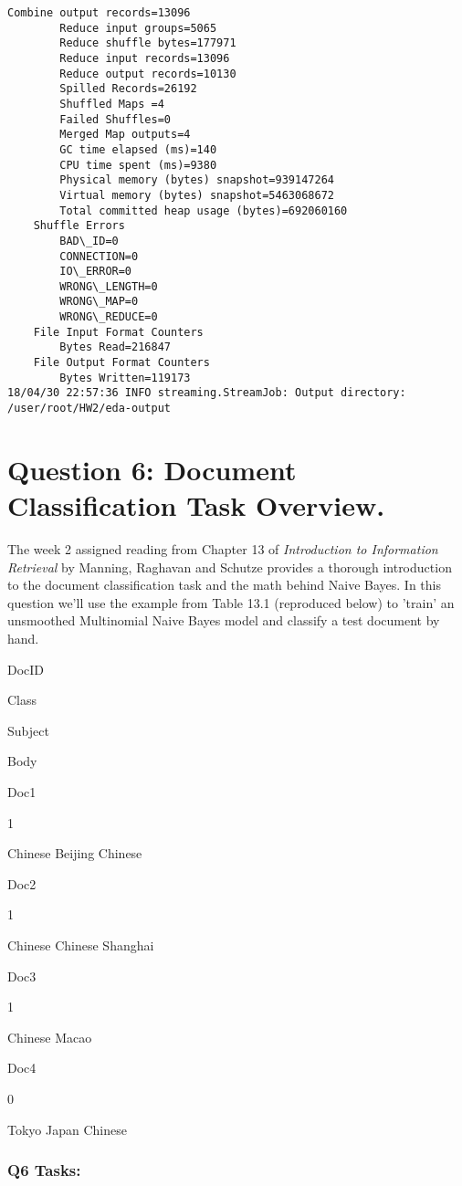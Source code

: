 \documentclass[11pt]{article}
\begin{document}
\begin{Verbatim}[commandchars=\\\{\}]
		Combine output records=13096
		Reduce input groups=5065
		Reduce shuffle bytes=177971
		Reduce input records=13096
		Reduce output records=10130
		Spilled Records=26192
		Shuffled Maps =4
		Failed Shuffles=0
		Merged Map outputs=4
		GC time elapsed (ms)=140
		CPU time spent (ms)=9380
		Physical memory (bytes) snapshot=939147264
		Virtual memory (bytes) snapshot=5463068672
		Total committed heap usage (bytes)=692060160
	Shuffle Errors
		BAD\_ID=0
		CONNECTION=0
		IO\_ERROR=0
		WRONG\_LENGTH=0
		WRONG\_MAP=0
		WRONG\_REDUCE=0
	File Input Format Counters 
		Bytes Read=216847
	File Output Format Counters 
		Bytes Written=119173
18/04/30 22:57:36 INFO streaming.StreamJob: Output directory: /user/root/HW2/eda-output

    \end{Verbatim}

    \section{Question 6: Document Classification Task
Overview.}\label{question-6-document-classification-task-overview.}

The week 2 assigned reading from Chapter 13 of \emph{Introduction to
Information Retrieval} by Manning, Raghavan and Schutze provides a
thorough introduction to the document classification task and the math
behind Naive Bayes. In this question we'll use the example from Table
13.1 (reproduced below) to 'train' an unsmoothed Multinomial Naive Bayes
model and classify a test document by hand.

DocID

Class

Subject

Body

Doc1

1

Chinese Beijing Chinese

Doc2

1

Chinese Chinese Shanghai

Doc3

1

Chinese Macao

Doc4

0

Tokyo Japan Chinese

\subsubsection{Q6 Tasks:}\label{q6-tasks}
\end{document}
